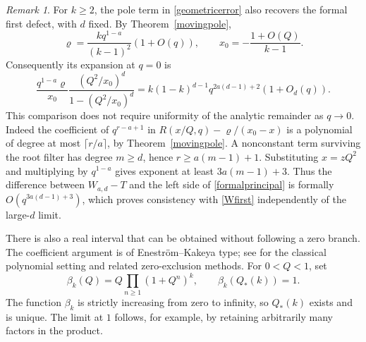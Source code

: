 \documentclass[11pt]{amsart}
\theoremstyle{definition}
\theoremstyle{remark}
\newtheorem{remark}[theorem]{Remark}
\numberwithin{equation}{section}
\begin{document}
\begin{remark}\label{poleconsistency}
For $k\ge2$, the pole term in \eqref{geometricerror} also recovers the formal first defect, with $d$ fixed. By Theorem~\ref{movingpole},
\[
 \varrho=\frac{kq^{1-a}}{(k-1)^2}(1+O(q)),\qquad
 x_0=-\frac{1+O(Q)}{k-1}.
\]
Consequently its expansion at $q=0$ is
\begin{equation}\label{formalprincipal}
 \frac{q^{1-a}\varrho}{x_0}
 \frac{(Q^2/x_0)^d}{1-(Q^2/x_0)^d}
 =k(1-k)^{d-1}q^{2a(d-1)+2}(1+O_d(q)).
\end{equation}
This comparison does not require uniformity of the analytic remainder as $q\to0$. Indeed the coefficient of $q^{r-a+1}$ in
$R(x/Q,q)-\varrho/(x_0-x)$ is a polynomial of degree at most $\lceil r/a\rceil$, by Theorem~\ref{movingpole}. A nonconstant term surviving the root filter has degree $m\ge d$, hence $r\ge a(m-1)+1$. Substituting $x=zQ^2$ and multiplying by $q^{1-a}$ gives exponent at least $3a(m-1)+3$. Thus the difference between $W_{a,d}-T$ and the left side of \eqref{formalprincipal} is formally $O(q^{3a(d-1)+3})$, which proves consistency with \eqref{Wfirst} independently of the large-$d$ limit.
\end{remark}


There is also a real interval that can be obtained without following a zero branch. The coefficient argument is of Enestr\"om--Kakeya type; see \cite{Melman} for the classical polynomial setting and related zero-exclusion methods. For $0<Q<1$, set
\begin{equation}\label{threshold}
 \beta_k(Q)=Q\prod_{n\ge1}(1+Q^n)^k,
 \qquad \beta_k(Q_*(k))=1.
\end{equation}
The function $\beta_k$ is strictly increasing from zero to infinity, so $Q_*(k)$ exists and is unique. The limit at $1$ follows, for example, by retaining arbitrarily many factors in the product.
\end{document}
